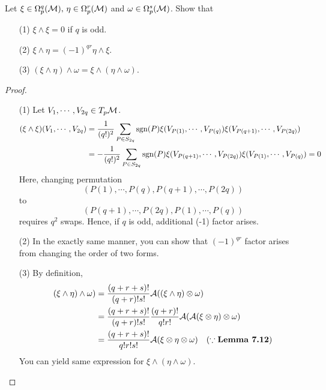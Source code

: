 \documentclass[a4paper, 10pt]{article}
\begin{document}

\begin{exer}
    Let $\xi \in \Omega_{p}^{q}(\mathcal{M}),\,\eta \in \Omega_{p}^{r}(\mathcal{M})$ and $\omega \in \Omega_{p}^{s}(\mathcal{M})$. Show that
    \begin{itemize}
        \item[(1)] $\xi \wedge \xi = 0$ if $q$ is odd.
        \item[(2)] $\xi \wedge \eta = (-1)^{qr}\eta \wedge \xi$.
        \item[(3)] $(\xi\wedge\eta)\wedge\omega = \xi\wedge(\eta\wedge\omega)$.
    \end{itemize}
\end{exer}

\begin{proof}
    \hphantom{.}
    \begin{itemize}
        \item[(1)] Let $V_{1},\cdots,V_{2q} \in T_{p}\mathcal{M}$.
        \begin{align*}
            (\xi\wedge\xi)(V_{1},\cdots,V_{2q}) &= \frac{1}{(q!)^{2}}\sum_{P \in S_{2q}}\mathrm{sgn}(P)\xi(V_{P(1)},\cdots,V_{P(q)})\xi(V_{P(q+1)},\cdots,V_{P(2q)}) \\
            &= -\frac{1}{(q!)^{2}}\sum_{P \in S_{2q}}\mathrm{sgn}(P)\xi(V_{P(q+1)},\cdots,V_{P(2q)})\xi(V_{P(1)},\cdots,V_{P(q)}) = 0
        \end{align*}
        Here, changing permutation 
        \[ (P(1),\cdots,P(q),P(q+1),\cdots,P(2q)) \]
        to
        \[ (P(q+1),\cdots,P(2q),P(1),\cdots,P(q)) \]
        requires $q^{2}$ swaps. Hence, if $q$ is odd, additional (-1) factor arises.
        \item[(2)] In the exactly same manner, you can show that $(-1)^{qr}$ factor arises from changing the order of two forms.
        \item[(3)] By definition,
        \begin{align*}
            (\xi \wedge \eta) \wedge \omega) &= \frac{(q+r+s)!}{(q+r)!s!} \mathcal{A}((\xi\wedge\eta) \otimes \omega) \\
            &= \frac{(q+r+s)!}{(q+r)!s!} \frac{(q+r)!}{q!r!} \mathcal{A}(\mathcal{A}(\xi \otimes \eta) \otimes \omega) \\
            &= \frac{(q+r+s)!}{q!r!s!}\mathcal{A}(\xi \otimes \eta \otimes \omega) \quad (\because \text{\textbf{Lemma 7.12}})
        \end{align*}
        You can yield same expression for $\xi \wedge (\eta \wedge \omega)$.
    \end{itemize}
\end{proof}
\end{document}
